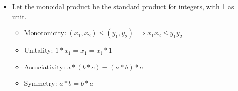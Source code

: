 \begin{itemize}
    \item Let the monoidal product be the standard product for integers, with 1 as unit.
          \begin{itemize}
            \item Monotonicity: $(x_1,x_2)\leq (y_1,y_2) \implies x_1x_2 \leq y_1y_2$
            \item Unitality: $1*x_1=x_1=x_1*1$
            \item Associativity: $a*(b*c)=(a*b)*c$
            \item Symmetry: $a*b=b*a$
          \end{itemize}
  \end{itemize}
